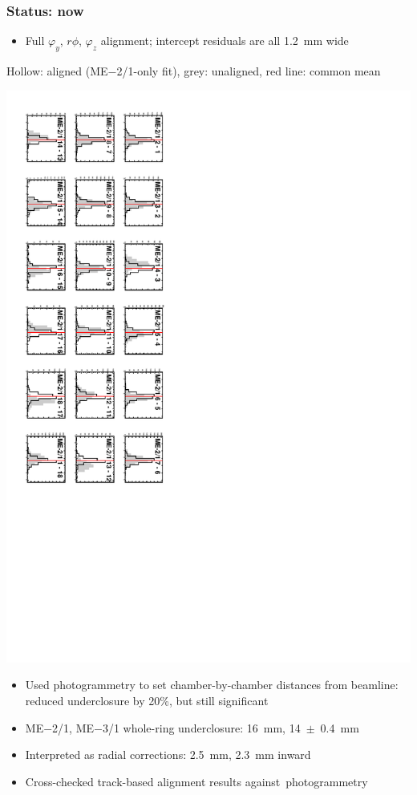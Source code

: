 \documentclass[compress]{beamer}
\begin{document}
\begin{frame}
\frametitle{Status: now}
\begin{itemize}
\item Full $\varphi_y$, $r\phi$, $\varphi_z$ alignment; intercept residuals are all 1.2~mm wide
\end{itemize}

\vfill
{\scriptsize Hollow: aligned (ME$-$2/1-only fit), grey: unaligned, red line: common mean}

\vspace{0.2 cm}
\includegraphics[height=\linewidth, angle=90]{residuals_hists_MEm21.pdf}

\vfill
\begin{itemize}
\item Used photogrammetry to set chamber-by-chamber distances from beamline: reduced underclosure by 20\%, but still significant
\item ME$-$2/1, ME$-$3/1 whole-ring underclosure: 16~mm, 14~$\pm$~0.4~mm
\item Interpreted as radial corrections: 2.5~mm, 2.3~mm inward
\item Cross-checked track-based alignment results \mbox{against photogrammetry\hspace{-1 cm}}
\end{itemize}
\end{frame}
\end{document}
